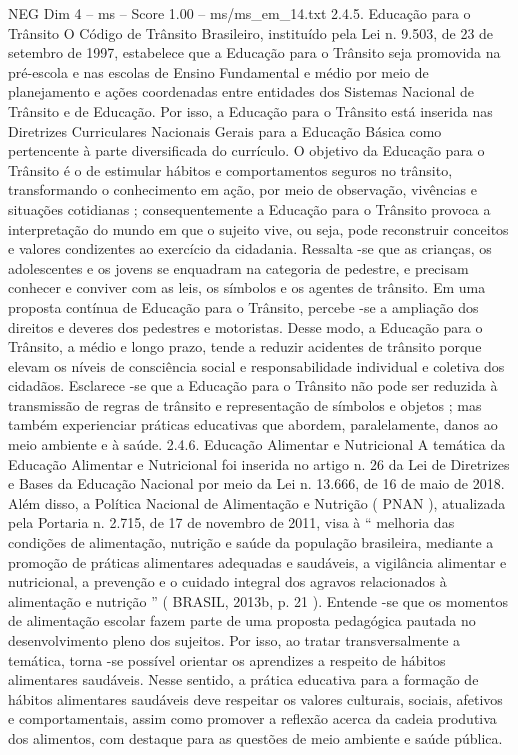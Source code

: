 \begin{textsample}{NEG Dim 4 – ms – Score 1.00 – ms/ms\_em\_14.txt}  \label{ex:f4_neg_138}
2.4.5.
Educação para o Trânsito O Código de Trânsito Brasileiro, instituído pela Lei n. 9.503, de 23 de setembro de 1997, estabelece que a Educação para o Trânsito seja promovida na pré-escola e nas escolas de Ensino Fundamental e médio por meio de planejamento e ações coordenadas entre entidades dos Sistemas Nacional de Trânsito e de Educação.
Por isso, a Educação para o Trânsito está inserida nas Diretrizes Curriculares Nacionais Gerais para a Educação Básica como pertencente à parte diversificada do currículo.
O objetivo da Educação para o Trânsito é o de estimular hábitos e comportamentos seguros no trânsito, transformando o conhecimento em ação, por meio de observação, vivências e situações cotidianas ; consequentemente a Educação para o Trânsito provoca a interpretação do mundo em que o sujeito vive, ou seja, pode reconstruir conceitos e valores condizentes ao exercício da cidadania.
Ressalta -se que as crianças, os adolescentes e os jovens se enquadram na categoria de pedestre, e precisam conhecer e conviver com as leis, os símbolos e os agentes de trânsito.
Em uma proposta contínua de Educação para o Trânsito, percebe -se a ampliação dos direitos e deveres dos pedestres e motoristas.
Desse modo, a Educação para o Trânsito, a médio e longo prazo, tende a reduzir acidentes de trânsito porque elevam os níveis de consciência social e responsabilidade individual e coletiva dos cidadãos.
Esclarece -se que a Educação para o Trânsito não pode ser reduzida à transmissão de regras de trânsito e representação de símbolos e objetos ; mas também experienciar práticas educativas que abordem, paralelamente, danos ao meio ambiente e à saúde. 2.4.6.
Educação Alimentar e Nutricional A temática da Educação Alimentar e Nutricional foi inserida no artigo n. 26 da Lei de Diretrizes e Bases da Educação Nacional por meio da Lei n. 13.666, de 16 de maio de 2018.
Além disso, a Política Nacional de Alimentação e Nutrição ( PNAN ), atualizada pela Portaria n. 2.715, de 17 de novembro de 2011, visa à “ melhoria das condições de alimentação, nutrição e saúde da população brasileira, mediante a promoção de práticas alimentares adequadas e saudáveis, a vigilância alimentar e nutricional, a prevenção e o cuidado integral dos agravos relacionados à alimentação e nutrição ” ( BRASIL, 2013b, p. 21 ).
Entende -se que os momentos de alimentação escolar fazem parte de uma proposta pedagógica pautada no desenvolvimento pleno dos sujeitos.
Por isso, ao tratar transversalmente a temática, torna -se possível orientar os aprendizes a respeito de hábitos alimentares saudáveis.
Nesse sentido, a prática educativa para a formação de hábitos alimentares saudáveis deve respeitar os valores culturais, sociais, afetivos e comportamentais, assim como promover a reflexão acerca da cadeia produtiva dos alimentos, com destaque para as questões de meio ambiente e saúde pública.

\end{textsample}
